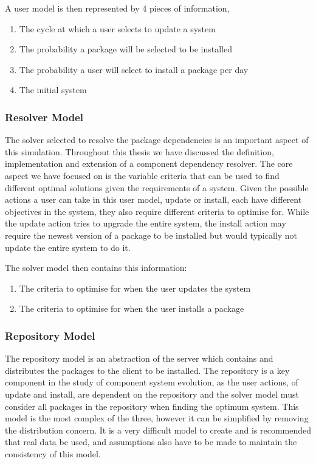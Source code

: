 A user model is then represented by 4 pieces of information,
\begin{enumerate}
  \item  The cycle at which a user selects to update a system
  \item The probability a package will be selected to be installed
  \item The probability a user will select to install a package per day
  \item The initial system
\end{enumerate}


\subsubsection{Resolver Model}
The solver selected to resolve the package dependencies is an important aspect of this simulation.
Throughout this thesis we have discussed the definition, implementation and extension of a component dependency resolver.
The core aspect we have focused on is the variable criteria that can be used to find different optimal solutions given the requirements of a system.
Given the possible actions a user can take in this user model, update or install, each have different objectives in the system,
they also require different criteria to optimise for.
While the update action tries to upgrade the entire system, 
the install action may require the newest version of a package to be installed but would typically not update the entire system to do it. 

The solver model then contains this information:
\begin{enumerate}
  \item The criteria to optimise for when the user updates the system
  \item The criteria to optimise for when the user installs a package
\end{enumerate}

\subsubsection{Repository Model}
The repository model is an abstraction of the server which contains and distributes the packages to the client to be installed.
The repository is a key component in the study of component system evolution, 
as the user actions, of update and install, are dependent on the repository and the solver model must consider all packages in the repository when finding the optimum system.
This model is the most complex of the three, however it can be simplified by removing the distribution concern.
It is a very difficult model to create and is recommended that real data be used,
and assumptions also have to be made to maintain the consistency of this model.

